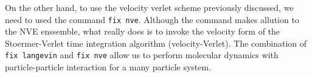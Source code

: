 On the other hand, to use the velocity verlet scheme previously discussed, we need to used the command \verb|fix nve|.
Although the command makes allution to the NVE enssemble, what really does is to invoke the velocity form of the Stoermer-Verlet time integration algorithm (velocity-Verlet).
The combination of \verb|fix langevin| and \verb|fix nve| allow us to perform molecular dynamics with particle-particle interaction for a many particle system.

